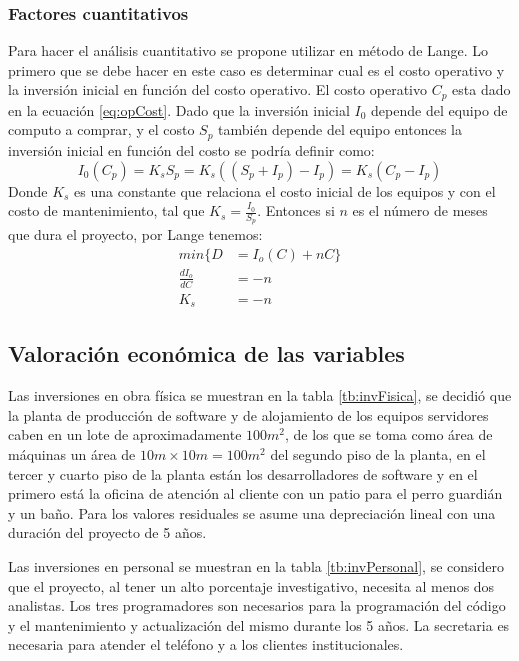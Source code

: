 \documentclass[a4paper, 12pt, oneside]{article}
\begin{document}
	\subsubsection{Factores cuantitativos}
	Para hacer el análisis cuantitativo se propone utilizar en método de Lange. Lo primero que se debe hacer en este caso es determinar cual es el costo operativo y la inversión inicial en función del costo operativo. El costo operativo $C_p$ esta dado en la ecuación \ref{eq:opCost}. Dado que la inversión inicial $I_0$ depende del equipo de computo a comprar, y el costo $S_p$ también depende del equipo entonces la inversión inicial en función del costo se podría definir como:
	\begin{equation}
		I_0(C_p) = K_sS_p = K_s((S_p+I_p) - I_p) = K_s(C_p - I_p)
		\label{eq:InvCost}
	\end{equation}
	Donde $K_s$ es una constante que relaciona el costo inicial de los equipos y con el costo de mantenimiento, tal que $K_s=\frac{I_0}{S_p}$. Entonces si $n$ es el número de meses que dura el proyecto, por Lange tenemos:
	\begin{align*}
		min\{D&=I_o(C)+nC\} \\
		\frac{dI_o}{dC}&=-n \\
		K_s &= -n
	\end{align*}
	
	\subsection{Valoración económica de las variables}
	Las inversiones en obra física se muestran en la tabla \ref{tb:invFisica}, se decidió que la planta de producción de software y de alojamiento de los equipos servidores caben en un lote de aproximadamente $100m^2$, de los que se toma como área de máquinas un área de $10m \times 10m = 100m^2$ del segundo piso de la planta, en el tercer y cuarto piso de la planta están los desarrolladores de software y en el primero está la oficina de atención al cliente con un patio para el perro guardián y un baño. Para los valores residuales se asume una depreciación lineal con una duración del proyecto de 5 años.

	Las inversiones en personal se muestran en la tabla \ref{tb:invPersonal}, se considero que el proyecto, al tener un alto porcentaje investigativo, necesita al menos dos analistas. Los tres programadores son necesarios para la programación del código y el mantenimiento y actualización del mismo durante los 5 años. La secretaria es necesaria para atender el teléfono y a los clientes institucionales.
\end{document}
